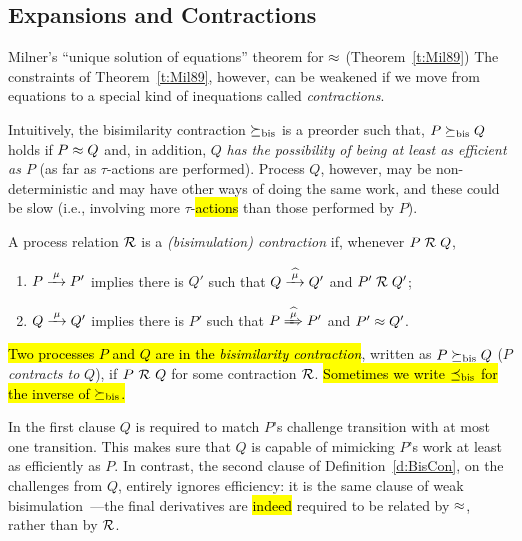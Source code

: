 \subsection{Expansions and Contractions}
\label{s:mcontr}

Milner's ``unique solution of equations'' theorem for $\approx$
(Theorem~\ref{t:Mil89})
The constraints of Theorem~\ref{t:Mil89}, however, can be 
weakened if we move from equations to a special kind of inequations called
  \emph{contractions}.

Intuitively, the bisimilarity contraction $\mathrel{\succeq_{\rm{bis}}}$ is a preorder
such that, $P \mathrel{\succeq_{\rm{bis}}} Q$ holds if $P \approx Q$ and, in addition, 
$Q$ \emph{has the possibility of being at least as efficient as $P$} (as far as
$\tau$-actions are performed).
Process $Q$, however, may be non-deterministic and may have other ways
of doing the same work, and these could be slow (i.e., involving
more $\tau$-\hl{actions} than those performed by $P$).

\begin{definition}[contraction]
\label{d:BisCon}
A process relation ${{\cal R}}$ 
 is a \emph{(bisimulation) contraction} if, whenever
 $P\mathrel{\cal R} Q$, %

\begin{enumerate}
\item   $P \arr\mu P'$ implies there is $Q'$ such that $Q \arcap \mu
  Q'$ and $P' \mathrel{\cal R} Q'$;
\item $Q \arr\mu Q'$   implies there is $P'$ such that $P \Arcap \mu
 P'$ and $P' \approx Q'$\enspace.
\end{enumerate}
\hl{Two processes $P$ and $Q$ are in the \emph{bisimilarity
    contraction}}, written as $P \mathrel{\succeq_{\rm{bis}}} Q$ ($P$ \emph{contracts to} $Q$),
if $P\ {\cal R}\ Q$ for some contraction ${\cal R}$.
\hl{Sometimes we write $\mathrel{\preceq_{\rm{bis}}}$ for the inverse of $\mathrel{\succeq_{\rm{bis}}}$.}
\end{definition}

In the first clause $Q$ is required to match $P$'s challenge
transition with at most one transition.
This makes sure that $Q$ is capable of mimicking %
$P$'s work at least as efficiently as $P$. 
In contrast, the second clause of Definition~\ref{d:BisCon}, on the
challenges from $Q$, entirely ignores efficiency: it is the same
clause of  weak bisimulation~---the final derivatives are \hl{indeed} required
to be related  by $\approx$, rather than by ${\cal R}$.

